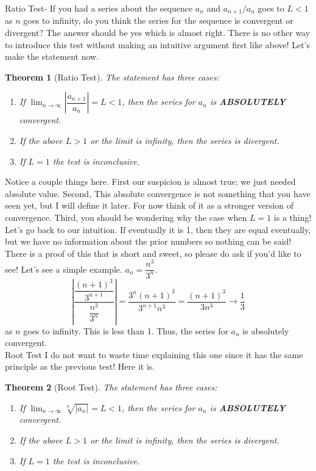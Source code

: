 \documentclass[10pt]{article}
\newcommand{\ds}{\displaystyle}
\theoremstyle{Theorem}
\newtheorem{theorem}{Theorem}[section]
\theoremstyle{definition}
\theoremstyle{remark}
\theoremstyle{custom}
\begin{document}
\newpage
Ratio Test- If you had a series about the sequence $a_n$ and $a_{n+1}/a_n$ goes to $L<1$ as $n$ goes to infinity, do you think the series for the sequence is convergent or divergent? 
The answer should be yes which is almost right. There is no other way to introduce this test without making an intuitive argument first like above! Let's make the statement now.
\begin{theorem}[Ratio Test]
The statement has three cases:
\begin{enumerate}[1.]
\item If $\ds \lim_{n\rightarrow \infty}\left|\dfrac{a_{n+1}}{a_n}\right| =L<1$, then the series for $a_n$ is \textbf{ABSOLUTELY} convergent. 
\item If the above $L>1$ or the limit is infinity, then the series is divergent.
\item If $L=1$ the test is inconclusive.
\end{enumerate}
\end{theorem}
Notice a couple things here. First our suspicion is almost true; we just needed absolute value. Second, This absolute convergence is not something that you have seen yet, but I will define it later. For now think of it as a stronger version of convergence. Third, you should be wondering why the case when $L=1$ is a thing! Let's go back to our intuition. If eventually it is 1, then they are equal eventually, but we have no information about the prior numbers so nothing can be said! There is a proof of this that is short and sweet, so please do ask if you'd like to see! Let's see a simple example. $a_n=\dfrac{n^3}{3^n}$. 
\[
\left|\dfrac{\dfrac{(n+1)^3}{3^{n+1}}}{\dfrac{n^3}{3^n}}\right|=\dfrac{3^n(n+1)^3}{3^{n+1}n^3}=\dfrac{(n+1)^3}{3n^3} \rightarrow \dfrac{1}{3}
\]
as $n$ goes to infinity. This is less than 1. Thus, the series for $a_n$ is absolutely convergent.\\
Root Test I do not want to waste time explaining this one since it has the same principle as the previous test! Here it is.
\begin{theorem}[Root Test]
The statement has three cases:
\begin{enumerate}[1.]
\item If $\ds \lim_{n\rightarrow \infty}\sqrt[n]{|a_n|}=L<1$, then the series for $a_n$ is \textbf{ABSOLUTELY} convergent. 
\item If the above $L>1$ or the limit is infinity, then the series is divergent.
\item If $L=1$ the test is inconclusive.
\end{enumerate}
\end{theorem}
\end{document}
